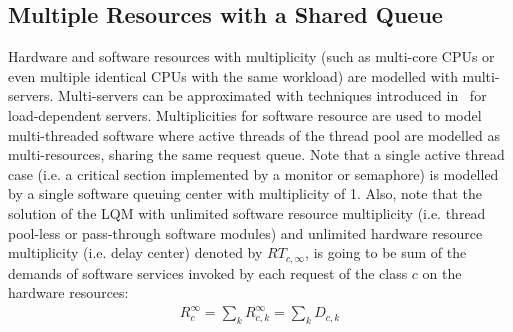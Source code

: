   \subsection{Multiple Resources with a Shared Queue} %
  Hardware and software resources with multiplicity (such as multi-core CPUs or even multiple identical CPUs with the same workload) are modelled with multi-servers. %
  Multi-servers can be approximated with techniques introduced in~\cite{seidmann1987computerized,menasce1994capacity,lazowska1984quantitative} for load-dependent servers.  
    Multiplicities for software resource are used to model multi-threaded software where active threads of the thread pool are modelled as multi-resources, sharing the same request queue. Note that a single active thread case (i.e. a critical section implemented by a monitor or semaphore) is modelled by a single software queuing center with multiplicity of 1. 
  Also, note that the solution of the LQM with unlimited software resource multiplicity (i.e. thread pool-less or pass-through software modules) and unlimited hardware resource multiplicity (i.e. delay center) denoted by $RT_{c,\infty}$, is going to be sum of the  demands of software services invoked by each request of the class $c$ on the hardware resources: 
  \begin{eqnarray} 
 R_{c}^\infty=\sum_k R_{c,k}^\infty = \sum_k D_{c,k} 
  \end{eqnarray}  

  
  
  

